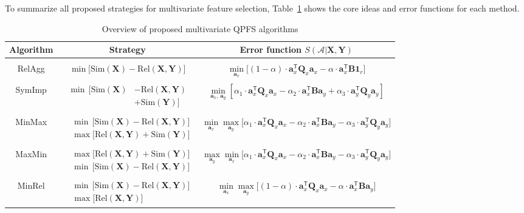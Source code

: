 \documentclass[12pt,twoside]{article}
\theoremstyle{definition}
\newcommand{\ba}{\mathbf{a}}
\newcommand{\bY}{\mathbf{Y}}
\newcommand{\bX}{\mathbf{X}}
\newcommand{\bB}{\mathbf{B}}
\newcommand{\bQ}{\mathbf{Q}}
\newcommand{\cA}{\mathcal{A}}
\newcommand{\T}{\mathsf{T}}
\newcommand{\bOne}{\boldsymbol{1}}
\begin{document}
To summarize all proposed strategies for multivariate feature selection, Table~\ref{tbl:summary} shows the core ideas and error functions for each method. 

\begin{table}
	\centering
	\small{
	\begin{tabular}{c|c|c}
		\hline
		Algorithm & Strategy & Error function $S(\cA | \bX, \bY)$ \\
		\hline && \\ [-.5em]
		RelAgg & $\min \bigl[ \text{Sim}(\bX) - \text{Rel}(\bX, \bY) \bigr] $ & $\min\limits_{\ba_x} \bigl[ (1 - \alpha) \cdot \ba_x^{\T} \bQ_x \ba_x - \alpha \cdot \ba_x^{\T} \bB \bOne_r \bigr] $ \\ &&\\[-.5em]
		SymImp & $\begin{aligned} \min \, \bigl[ \text{Sim}(\bX) & - \text{Rel}(\bX, \bY) \\ & + \text{Sim}(\bY) \bigr] \end{aligned}$ & $ \min\limits_{\ba_x, \, \ba_y} \left[ \alpha_1 \cdot \ba_x^{\T} \bQ_x \ba_x - \alpha_2 \cdot \ba_x^{\T} \bB \ba_y + \alpha_3 \cdot \ba_y^{\T} \bQ_y \ba_y \right] $\\ &&\\ [-.5em]
		MinMax & $\begin{aligned} &\min \, \bigl[ \text{Sim}(\bX) - \text{Rel}(\bX, \bY) \bigr]  \\ & \max \bigl[\text{Rel}(\bX, \bY) + \text{Sim}(\bY) \bigr] \end{aligned}$ & $	\min\limits_{\ba_x} 	\max\limits_{\ba_y} \bigl[\alpha_1 \cdot \ba_x^{\T} \bQ_x \ba_x - \alpha_2 \cdot \ba_x^{\T} \bB \ba_y - \alpha_3 \cdot \ba_y^{\T} \bQ_y \ba_y \bigr]$ \\ &&\\ 
		MaxMin & $\begin{aligned} &\max \bigl[\text{Rel}(\bX, \bY) + \text{Sim}(\bY) \bigr] \\ & \min \, \bigl[ \text{Sim}(\bX) - \text{Rel}(\bX, \bY) \bigr]  \end{aligned}$ & $\max\limits_{\ba_y} \min\limits_{\ba_x} \bigl[\alpha_1 \cdot \ba_x^{\T} \bQ_x \ba_x - \alpha_2 \cdot \ba_x^{\T} \bB \ba_y - \alpha_3 \cdot \ba_y^{\T} \bQ_y \ba_y \bigr]$\\ &&\\ [-.5em]
		MinRel & $\begin{aligned} &\min \, \bigl[ \text{Sim}(\bX) - \text{Rel}(\bX, \bY) \bigr]  \\ & \max \bigl[\text{Rel}(\bX, \bY) \bigr] \end{aligned}$& $\min\limits_{\ba_x} 	\max\limits_{\ba_y} \bigl[ (1 - \alpha) \cdot \ba_x^{\T} \bQ_x \ba_x - \alpha \cdot \ba_x^{\T} \bB \ba_y \bigr]$ \\ 
		\hline
	\end{tabular}}
	\caption{Overview of proposed multivariate QPFS algorithms}
	\label{tbl:summary}
\end{table}
\end{document}
